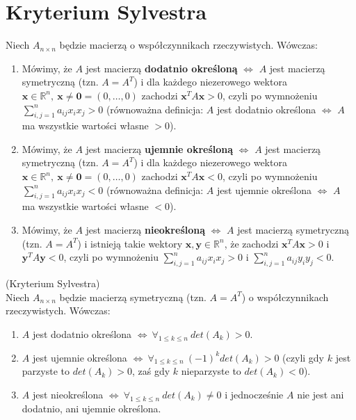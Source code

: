 \section{Kryterium Sylvestra}

\begin{df}
Niech $A_{n\times n}$ będzie macierzą o współczynnikach rzeczywistych. Wówczas:
\begin{enumerate}[\rm 1.]
\item
Mówimy, że $A$ jest macierzą \textbf{dodatnio określoną} $\Leftrightarrow$ $A$ jest macierzą symetryczną (tzn. $A=A^T$) i dla każdego niezerowego wektora $\textbf{x}\in\mathbb{R}^n,\ \textbf{x}\neq\textbf{0}=(0,\ldots,0)$ zachodzi $\textbf{x}^TA\textbf{x}>0$, czyli po wymnożeniu $\sum_{i,j=1}^n a_{ij}x_ix_j>0$ (równoważna definicja: $A$ jest dodatnio określona $\Leftrightarrow$ $A$ ma wszystkie wartości własne $>0$).
\item
Mówimy, że $A$ jest macierzą \textbf{ujemnie określoną} $\Leftrightarrow$ $A$ jest macierzą symetryczną (tzn. $A=A^T$) i dla każdego niezerowego wektora $\textbf{x}\in\mathbb{R}^n,\ \textbf{x}\neq\textbf{0}=(0,\ldots,0)$ zachodzi $\textbf{x}^TA\textbf{x}<0$, czyli po wymnożeniu $\sum_{i,j=1}^n a_{ij}x_ix_j<0$ (równoważna definicja: $A$ jest ujemnie określona $\Leftrightarrow$ $A$ ma wszystkie wartości własne $<0$).
\item
Mówimy, że $A$ jest macierzą \textbf{nieokreśloną} $\Leftrightarrow$ $A$ jest macierzą symetryczną (tzn. $A=A^T$) i istnieją takie wektory $\textbf{x},\textbf{y}\in\mathbb{R}^n$, że zachodzi $\textbf{x}^TA\textbf{x}>0$ i $\textbf{y}^TA\textbf{y}<0$, czyli po wymnożeniu $\sum_{i,j=1}^n a_{ij}x_ix_j>0$ i $\sum_{i,j=1}^n a_{ij}y_iy_j<0$.
\end{enumerate}
\end{df}

\begin{tw}{(Kryterium Sylvestra)}\\
Niech $A_{n\times n}$ będzie macierzą symetryczną (tzn. $A=A^T$) o współczynnikach rzeczywistych. Wówczas:
\begin{enumerate}[\rm 1.]
\item
$A$ jest dodatnio określona $\Leftrightarrow\ \forall_{1\leq k\leq n}\ det(A_k)>0$.
\item
$A$ jest ujemnie określona $\Leftrightarrow\ \forall_{1\leq k\leq n}\ (-1)^kdet(A_k)>0$ (czyli gdy $k$ jest parzyste to $det(A_k)>0$, zaś gdy $k$ nieparzyste to $det(A_k)<0$).
\item
$A$ jest nieokreślona $\Leftrightarrow\ \forall_{1\leq k\leq n}\ det(A_k)\neq 0$ i jednocześnie $A$ nie jest ani dodatnio, ani ujemnie określona.
\end{enumerate}
\end{tw}

